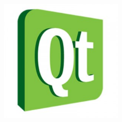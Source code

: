 \begin{frame}
\begin{columns}[T]
\begin{column}{.3\textwidth}
			\vspace{7mm}
			\includegraphics[width=0.45\textwidth]{images/qt.jpg}\\
		\end{column}
	\end{columns}
\end{frame}